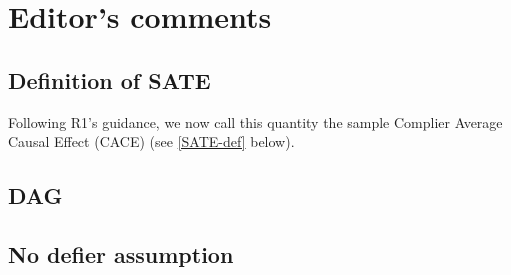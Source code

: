 \documentclass[hidelinks,12pt,letterpaper]{article}
\begin{document}
 


\tableofcontents

\pagebreak
{}%

\section{Editor's comments}

\subsection{Definition of SATE}

Following R1's guidance, we now call this quantity the sample Complier Average Causal Effect (CACE) (see \ref{SATE-def} below). 

\subsection{DAG}

\subsection{No defier assumption}
\end{document}
